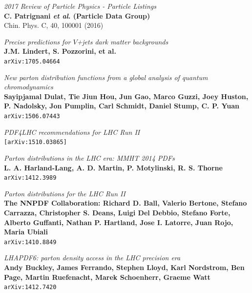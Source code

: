 \documentclass[11pt,a4paper,openright,twoside]{report}
\begin{document}
\begin{thebibliography}{9}
	\textit{2017 Review of Particle Physics - Particle Listings}\\
	\textbf{C. Patrignani \textit{et al}. (Particle Data Group)}\\
	Chin. Phys. C, 40, 100001 (2016)
	
	\textit{Precise predictions for $V$+jets dark matter backgrounds}\\
	\textbf{J.M. Lindert, S. Pozzorini, et al.}\\
	\texttt{arXiv:1705.04664}
	
	\textit{New parton distribution functions from a global analysis of quantum chromodynamics}\\
	\textbf{Sayipjamal Dulat, Tie Jiun Hou, Jun Gao, Marco Guzzi, Joey Huston, P. Nadolsky, Jon Pumplin, Carl Schmidt, Daniel Stump, C. P. Yuan}\\
	\texttt{arXiv:1506.07443}

	\textit{PDF4LHC recommendations for LHC Run II}\\
	\texttt{[arXiv:1510.03865]}	
	
	\textit{Parton distributions in the LHC era: MMHT 2014 PDFs}\\
	\textbf{L. A. Harland-Lang, A. D. Martin, P. Motylinski, R. S. Thorne}\\
	\texttt{arXiv:1412.3989}
	
	\textit{Parton distributions for the LHC Run II}\\
	\textbf{The NNPDF Collaboration: Richard D. Ball, Valerio Bertone, Stefano Carrazza, Christopher S. Deans, Luigi Del Debbio, Stefano Forte, Alberto Guffanti, Nathan P. Hartland, Jose I. Latorre, Juan Rojo, Maria Ubiali}\\
	\texttt{arXiv:1410.8849}
	
	\textit{LHAPDF6: parton density access in the LHC precision era}\\
	\textbf{Andy Buckley, James Ferrando, Stephen Lloyd, Karl Nordstrom, Ben Page, Martin Ruefenacht, Marek Schoenherr, Graeme Watt}\\
	\texttt{arXiv:1412.7420}


\end{thebibliography}
\end{document}
